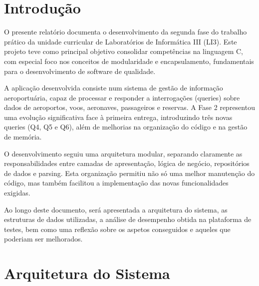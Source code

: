 \documentclass[a4paper,12pt]{scrreprt}
\begin{document}
\makecover %

\renewenvironment{abstract}
 {\par\noindent\textbf{\Large\abstractname}\par\bigskip}
 {}

\pagebreak

\renewcommand{\contentsname}{Índice}
\tableofcontents
\pagebreak


\chapter{Introdução}

O presente relatório documenta o desenvolvimento da segunda fase do trabalho prático da unidade curricular de Laboratórios de Informática III (LI3). Este projeto teve como principal objetivo consolidar competências na linguagem C, com especial foco nos conceitos de modularidade e encapsulamento, fundamentais para o desenvolvimento de software de qualidade.

A aplicação desenvolvida consiste num sistema de gestão de informação aeroportuária, capaz de processar e responder a interrogações (queries) sobre dados de aeroportos, voos, aeronaves, passageiros e reservas. A Fase 2 representou uma evolução significativa face à primeira entrega, introduzindo três novas queries (Q4, Q5 e Q6), além de melhorias na organização do código e na gestão de memória.

O desenvolvimento seguiu uma arquitetura modular, separando claramente as responsabilidades entre camadas de apresentação, lógica de negócio, repositórios de dados e parsing. Esta organização permitiu não só uma melhor manutenção do código, mas também facilitou a implementação das novas funcionalidades exigidas.

Ao longo deste documento, será apresentada a arquitetura do sistema, as estruturas de dados utilizadas, a análise de desempenho obtida na plataforma de testes, bem como uma reflexão sobre os aspetos conseguidos e aqueles que poderiam ser melhorados.

\chapter{Arquitetura do Sistema}
\end{document}
